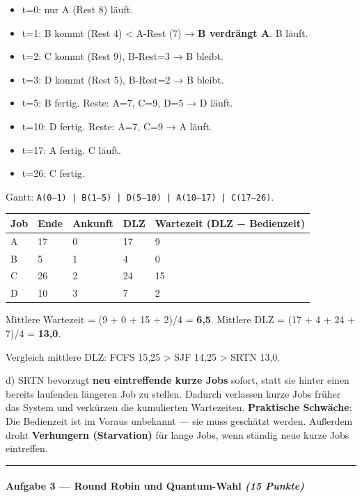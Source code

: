 \documentclass[11pt, a4paper]{article}
\begin{document}
\begin{itemize}
  \item t=0: nur A (Rest 8) läuft.
  \item t=1: B kommt (Rest 4) < A-Rest (7) → \textbf{B verdrängt A}. B läuft.
  \item t=2: C kommt (Rest 9), B-Rest=3 → B bleibt.
  \item t=3: D kommt (Rest 5), B-Rest=2 → B bleibt.
  \item t=5: B fertig. Reste: A=7, C=9, D=5 → D läuft.
  \item t=10: D fertig. Reste: A=7, C=9 → A läuft.
  \item t=17: A fertig. C läuft.
  \item t=26: C fertig.
\end{itemize}

Gantt: \texttt{A(0–1) | B(1–5) | D(5–10) | A(10–17) | C(17–26)}.



{\small
\begin{tabularx}{\linewidth}{XXXXX}
\hline
\rowcolor{tableheadbg}
{\color{white}\textbf{Job}} & {\color{white}\textbf{Ende}} & {\color{white}\textbf{Ankunft}} & {\color{white}\textbf{DLZ}} & {\color{white}\textbf{Wartezeit (DLZ − Bedienzeit)}} \\[2pt]
\hline
\endhead
\hline
\endfoot
A & 17 & 0 & 17 & 9 \\
B & 5 & 1 & 4 & 0 \\
C & 26 & 2 & 24 & 15 \\
D & 10 & 3 & 7 & 2 \\
\end{tabularx}
}


Mittlere Wartezeit = (9 + 0 + 15 + 2)/4 = \textbf{6,5}. Mittlere DLZ = (17 + 4 + 24 + 7)/4 = \textbf{13,0}.


Vergleich mittlere DLZ: FCFS 15,25 > SJF 14,25 > SRTN 13,0.


d) SRTN bevorzugt \textbf{neu eintreffende kurze Jobs} sofort, statt sie hinter einen bereits laufenden längeren Job zu stellen. Dadurch verlassen kurze Jobs früher das System und verkürzen die kumulierten Wartezeiten. \textbf{Praktische Schwäche}: Die Bedienzeit ist im Voraus unbekannt — sie muss geschätzt werden. Außerdem droht \textbf{Verhungern (Starvation)} für lange Jobs, wenn ständig neue kurze Jobs eintreffen.



\noindent\textcolor{rulegray}{\rule{\linewidth}{0.4pt}}


\paragraph{Aufgabe 3 — Round Robin und Quantum-Wahl \textit{(15 Punkte)}}\mbox{}\\[2pt]
\end{document}

